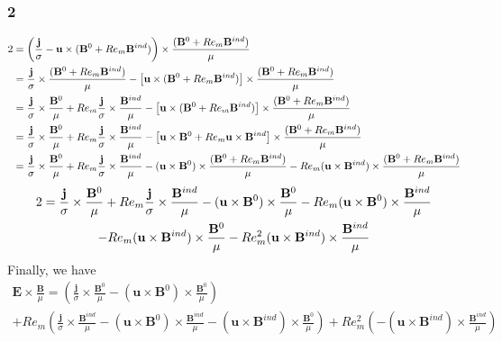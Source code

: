 \documentclass[11pt]{article}
\newcommand{\B}{\mathbf{B}}
\newcommand{\E}{\mathbf{E}}
\newcommand{\JS}{\frac{\mathbf{j}}{\sigma}}
\newcommand{\U}{\mathbf{u}}
\begin{document}
\subsubsection{2}
\begin{align}
	2 \notag
	& = \left(\JS - \U \times (\B^0 + Re_m \B^{ind}) \right) \times \frac{(\B^0 + Re_m \B^{ind})}{\mu} \notag \\
	& = \JS \times \frac{(\B^0 + Re_m \B^{ind})}{\mu} 
	- \left[ \U \times (\B^0 + Re_m \B^{ind}) \right] \times \frac{(\B^0 + Re_m \B^{ind})}{\mu}	\notag \\
	& = \JS \times \frac{\B^0}{\mu} + Re_m \JS \times \frac{\B^{ind}}{\mu} 
	- \left[ \U \times (\B^0 + Re_m \B^{ind}) \right] \times \frac{(\B^0 + Re_m \B^{ind})}{\mu}	\notag \\
	& = \JS \times \frac{\B^0}{\mu} + Re_m \JS \times \frac{\B^{ind}}{\mu} 
	- \left[ \U \times \B^0 + Re_m \U \times \B^{ind} \right] \times \frac{(\B^0 + Re_m \B^{ind})}{\mu}	\notag \\
	& = \JS \times \frac{\B^0}{\mu} + Re_m \JS \times \frac{\B^{ind}}{\mu} 
	- (\U \times \B^0) \times \frac{(\B^0 + Re_m \B^{ind})}{\mu}
	- Re_m (\U \times \B^{ind}) \times \frac{(\B^0 + Re_m \B^{ind})}{\mu} \notag \\
\end{align}
\begin{multline}
	2 = \JS \times \frac{\B^0}{\mu} + Re_m \JS \times \frac{\B^{ind}}{\mu} 
	- (\U \times \B^0) \times \frac{\B^0}{\mu}
	- Re_m (\U \times \B^0) \times \frac{\B^{ind}}{\mu} \\
	- Re_m (\U \times \B^{ind}) \times \frac{\B^0}{\mu}
	- Re_m^2 (\U \times \B^{ind}) \times \frac{\B^{ind}}{\mu} \notag \\
\end{multline}
Finally, we have
\begin{multline}
	\E \times \frac{\B}{\mu} =
	\left( \JS \times \frac{\B^0}{\mu} 
	- (\U \times \B^0) \times \frac{\B^0}{\mu}
	\right) \\
	+ Re_m
	\left(
	\JS \times \frac{\B^{ind}}{\mu} 
	- (\U \times \B^0) \times \frac{\B^{ind}}{\mu}
	- (\U \times \B^{ind}) \times \frac{\B^0}{\mu}
	\right)
	+Re_m^2 \left(
	- (\U \times \B^{ind}) \times \frac{\B^{ind}}{\mu}
	\right)
\end{multline}
\end{document}
